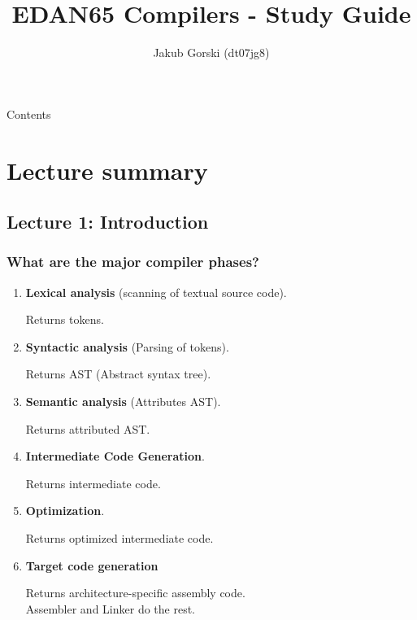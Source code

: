 \documentclass[11pt]{beamer}
\author{Jakub Gorski (dt07jg8)}
\title{EDAN65 Compilers - Study Guide}
\begin{document}
\begin{frame}
\titlepage
\end{frame}


\begin{frame}{Contents}
\tableofcontents
\end{frame}

\section{Lecture summary}
\subsection{Lecture 1: Introduction}
\begin{frame}
\frametitle{What are the major compiler phases?}
\begin{enumerate}
\item \textbf{Lexical analysis} (scanning of textual source code). 

Returns tokens.
\item \textbf{Syntactic analysis} (Parsing of tokens).

Returns AST (Abstract syntax tree).
\item \textbf{Semantic analysis} (Attributes AST).

Returns attributed AST.
\item \textbf{Intermediate Code Generation}.

Returns intermediate code.
\item \textbf{Optimization}.

Returns optimized intermediate code.
\item \textbf{Target code generation}

Returns architecture-specific assembly code. \\Assembler and Linker do the rest.
\end{enumerate}
\end{frame}
\end{document}
